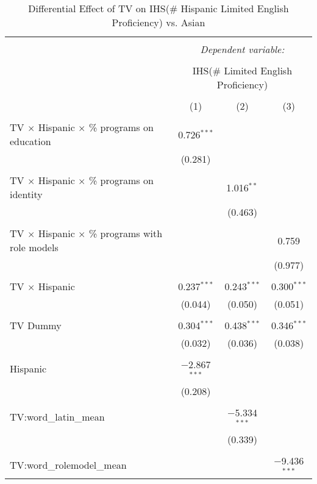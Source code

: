 
\begin{table}[!htbp] \centering 
  \caption{Differential Effect of TV on IHS(\# Hispanic Limited English Proficiency) vs. Asian} 
  \label{} 
\begin{tabular}{@{\extracolsep{-2pt}}lccc} 
\\[-1.8ex]\hline 
\hline \\[-1.8ex] 
 & \multicolumn{3}{c}{\textit{Dependent variable:}} \\ 
\cline{2-4} 
\\[-1.8ex] & \multicolumn{3}{c}{IHS(\# Limited English Proficiency)} \\ 
\\[-1.8ex] & (1) & (2) & (3)\\ 
\hline \\[-1.8ex] 
 TV $\times$ Hispanic $\times$ \% programs on education & 0.726$^{***}$ &  &  \\ 
  & (0.281) &  &  \\ 
  & & & \\ 
 TV $\times$ Hispanic $\times$ \% programs on identity &  & 1.016$^{**}$ &  \\ 
  &  & (0.463) &  \\ 
  & & & \\ 
 TV $\times$ Hispanic $\times$ \% programs with role models &  &  & 0.759 \\ 
  &  &  & (0.977) \\ 
  & & & \\ 
 TV $\times$ Hispanic & 0.237$^{***}$ & 0.243$^{***}$ & 0.300$^{***}$ \\ 
  & (0.044) & (0.050) & (0.051) \\ 
  & & & \\ 
 TV Dummy & 0.304$^{***}$ & 0.438$^{***}$ & 0.346$^{***}$ \\ 
  & (0.032) & (0.036) & (0.038) \\ 
  & & & \\ 
 Hispanic & $-$2.867$^{***}$ &  &  \\ 
  & (0.208) &  &  \\ 
  & & & \\ 
 TV:word\_latin\_mean &  & $-$5.334$^{***}$ &  \\ 
  &  & (0.339) &  \\ 
  & & & \\ 
 TV:word\_rolemodel\_mean &  &  & $-$9.436$^{***}$ \\ 

\end{tabular}
\end{table}
